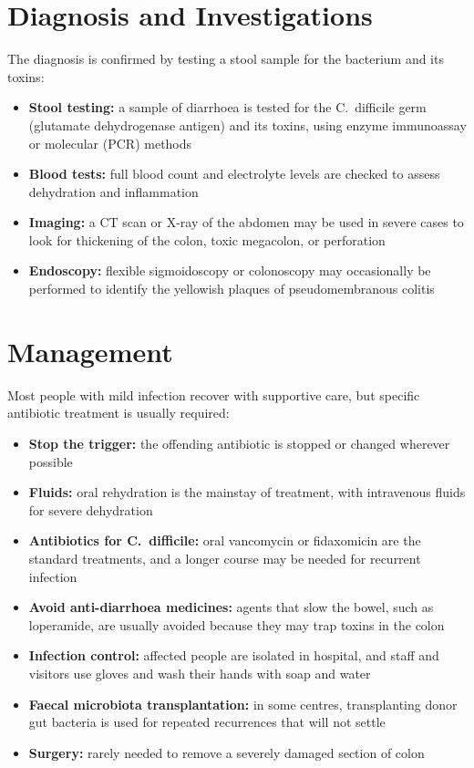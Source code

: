 \section*{Diagnosis and Investigations}
The diagnosis is confirmed by testing a stool sample for the bacterium and its toxins:
\begin{itemize}
    \item \textbf{Stool testing:} a sample of diarrhoea is tested for the C.\ difficile germ (glutamate dehydrogenase antigen) and its toxins, using enzyme immunoassay or molecular (PCR) methods
    \item \textbf{Blood tests:} full blood count and electrolyte levels are checked to assess dehydration and inflammation
    \item \textbf{Imaging:} a CT scan or X-ray of the abdomen may be used in severe cases to look for thickening of the colon, toxic megacolon, or perforation
    \item \textbf{Endoscopy:} flexible sigmoidoscopy or colonoscopy may occasionally be performed to identify the yellowish plaques of pseudomembranous colitis
\end{itemize}

\section*{Management}
Most people with mild infection recover with supportive care, but specific antibiotic treatment is usually required:
\begin{itemize}
    \item \textbf{Stop the trigger:} the offending antibiotic is stopped or changed wherever possible
    \item \textbf{Fluids:} oral rehydration is the mainstay of treatment, with intravenous fluids for severe dehydration
    \item \textbf{Antibiotics for C.\ difficile:} oral vancomycin or fidaxomicin are the standard treatments, and a longer course may be needed for recurrent infection
    \item \textbf{Avoid anti-diarrhoea medicines:} agents that slow the bowel, such as loperamide, are usually avoided because they may trap toxins in the colon
    \item \textbf{Infection control:} affected people are isolated in hospital, and staff and visitors use gloves and wash their hands with soap and water
    \item \textbf{Faecal microbiota transplantation:} in some centres, transplanting donor gut bacteria is used for repeated recurrences that will not settle
    \item \textbf{Surgery:} rarely needed to remove a severely damaged section of colon
\end{itemize}


